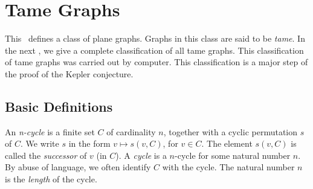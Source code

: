

\label{sec:tame}


\chapter{Tame Graphs}
\label{sec:def-and-class}

This \chap\ defines a class of plane graphs.  Graphs in this class
are said to be {\it tame}.  In the next \chap, we give a complete
classification of all tame graphs.  This classification of tame
graphs was carried out by computer. This classification is a major
step of the proof of the Kepler conjecture.

\section{Basic Definitions}

\begin{definition}
An {\it n-cycle\/} is a finite set $C$ of cardinality $n$,
together with a cyclic permutation $s$ of $C$.   We write $s$ in
the form $v\mapsto s(v,C)$, for $v\in C$.  The element $s(v,C)$ is
called the {\it successor\/} of $v$ (in $C$).  A {\it cycle\/} is
a $n$-cycle for some natural number $n$. By abuse of language, we
often identify $C$ with the cycle. The natural number $n$ is the
{\it length\/} of the cycle.
%
\end{definition}


